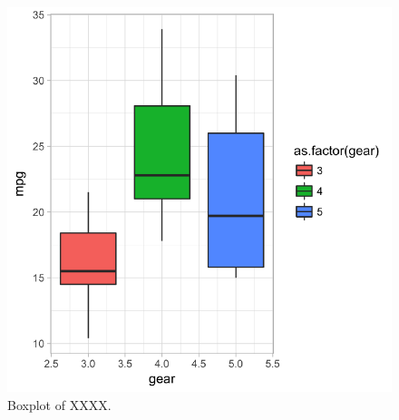 \documentclass[12pt,]{article}
\begin{document}
\newpage

\hypertarget{section-2}{%
\section{}\label{section-2}}

\begin{figure}
\centering
\includegraphics{main_text_files/figure-latex/boxplt-1.pdf}
\caption{\label{fig:boxplt}Boxplot of XXXX.}
\end{figure}



\newpage
\singlespacing
\end{document}
